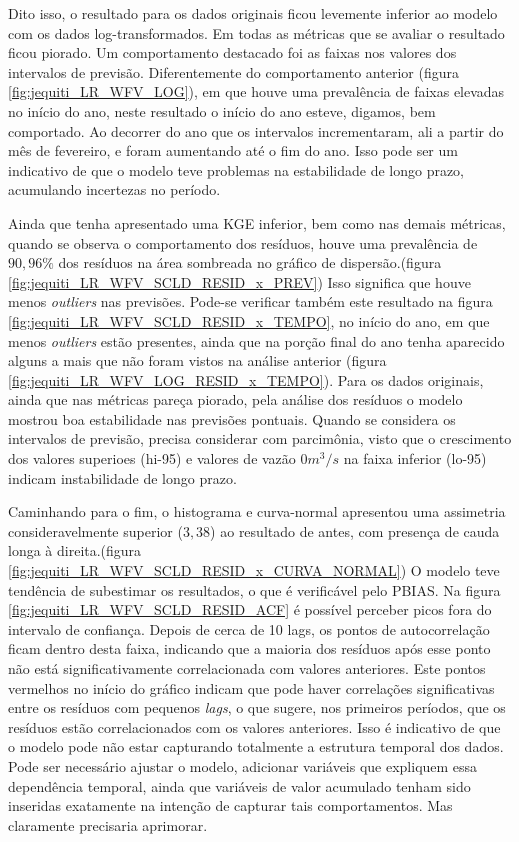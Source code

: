 Dito isso, o resultado para os dados originais ficou levemente inferior ao modelo com os dados log-transformados. Em todas as métricas que se avaliar o resultado ficou piorado. Um comportamento destacado foi as faixas nos valores dos intervalos de previsão. Diferentemente do comportamento anterior (figura \ref{fig:jequiti_LR_WFV_LOG}), em que houve uma prevalência de faixas elevadas no início do ano, neste resultado o início do ano esteve, digamos, bem comportado. Ao decorrer do ano que os intervalos incrementaram, ali a partir do mês de fevereiro, e foram aumentando até o fim do ano. Isso pode ser um indicativo de que o modelo teve problemas na estabilidade de longo prazo, acumulando incertezas no período.

Ainda que tenha apresentado uma KGE inferior, bem como nas demais métricas, quando se observa o comportamento dos resíduos, houve uma prevalência de $90,96\%$ dos resíduos na área sombreada no gráfico de dispersão.(figura \ref{fig:jequiti_LR_WFV_SCLD_RESID_x_PREV}) Isso significa que houve menos \textit{outliers} nas previsões. Pode-se verificar também este resultado na figura \ref{fig:jequiti_LR_WFV_SCLD_RESID_x_TEMPO}, no início do ano, em que menos \textit{outliers} estão presentes, ainda que na porção final do ano tenha aparecido alguns a mais que não foram vistos na análise anterior (figura \ref{fig:jequiti_LR_WFV_LOG_RESID_x_TEMPO}). Para os dados originais, ainda que nas métricas pareça piorado, pela análise dos resíduos o modelo mostrou boa estabilidade nas previsões pontuais. Quando se considera os intervalos de previsão, precisa considerar com parcimônia, visto que o crescimento dos valores superioes (hi-95) e valores de vazão $0 m^3/s$ na faixa inferior (lo-95) indicam instabilidade de longo prazo.


Caminhando para o fim, o histograma e curva-normal apresentou uma assimetria consideravelmente superior ($3,38$) ao resultado de antes, com presença de cauda longa à direita.(figura \ref{fig:jequiti_LR_WFV_SCLD_RESID_x_CURVA_NORMAL}) O modelo teve tendência de subestimar os resultados, o que é verificável pelo PBIAS. Na figura \ref{fig:jequiti_LR_WFV_SCLD_RESID_ACF} é possível perceber picos fora do intervalo de confiança. Depois de cerca de 10 lags, os pontos de autocorrelação ficam dentro desta faixa, indicando que a maioria dos resíduos após esse ponto não está significativamente correlacionada com valores anteriores. Este pontos vermelhos no início do gráfico indicam que pode haver correlações significativas entre os resíduos com pequenos \textit{lags}, o que sugere, nos primeiros períodos, que os resíduos estão correlacionados com os valores anteriores. Isso é indicativo de que o modelo pode não estar capturando totalmente a estrutura temporal dos dados. Pode ser necessário ajustar o modelo, adicionar variáveis que expliquem essa dependência temporal, ainda que variáveis de valor acumulado tenham sido inseridas exatamente na intenção de capturar tais comportamentos. Mas claramente precisaria aprimorar.

